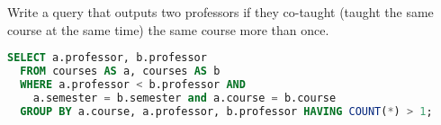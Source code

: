 \question Write a query that outputs two professors if they co-taught (taught
the same course at the same time) the same course more than once.

\begin{solution}[1in]
\begin{lstlisting}[language=SQL]
SELECT a.professor, b.professor
  FROM courses AS a, courses AS b
  WHERE a.professor < b.professor AND
    a.semester = b.semester and a.course = b.course
  GROUP BY a.course, a.professor, b.professor HAVING COUNT(*) > 1;
\end{lstlisting}
\end{solution}
